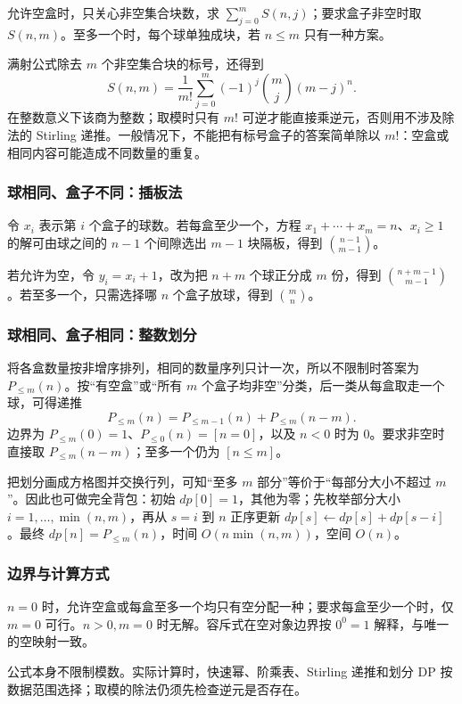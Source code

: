 允许空盒时，只关心非空集合块数，求 $\sum_{j=0}^m S(n,j)$；要求盒子非空时取 $S(n,m)$。至多一个时，每个球单独成块，若 $n\leq m$ 只有一种方案。

满射公式除去 $m$ 个非空集合块的标号，还得到
\[
    S(n,m)=\frac1{m!}\sum_{j=0}^m(-1)^j\binom mj(m-j)^n.
\]
在整数意义下该商为整数；取模时只有 $m!$ 可逆才能直接乘逆元，否则用不涉及除法的 Stirling 递推。一般情况下，不能把有标号盒子的答案简单除以 $m!$：空盒或相同内容可能造成不同数量的重复。

\subsubsection*{球相同、盒子不同：插板法}
令 $x_i$ 表示第 $i$ 个盒子的球数。若每盒至少一个，方程 $x_1+\cdots+x_m=n$、$x_i\geq1$ 的解可由球之间的 $n-1$ 个间隙选出 $m-1$ 块隔板，得到 $\binom{n-1}{m-1}$。

若允许为空，令 $y_i=x_i+1$，改为把 $n+m$ 个球正分成 $m$ 份，得到 $\binom{n+m-1}{m-1}$。若至多一个，只需选择哪 $n$ 个盒子放球，得到 $\binom mn$。

\subsubsection*{球相同、盒子相同：整数划分}
将各盒数量按非增序排列，相同的数量序列只计一次，所以不限制时答案为 $P_{\leq m}(n)$。按“有空盒”或“所有 $m$ 个盒子均非空”分类，后一类从每盒取走一个球，可得递推
\[
    P_{\leq m}(n)=P_{\leq m-1}(n)+P_{\leq m}(n-m).
\]
边界为 $P_{\leq m}(0)=1$、$P_{\leq0}(n)=[n=0]$，以及 $n<0$ 时为 $0$。要求非空时直接取 $P_{\leq m}(n-m)$；至多一个仍为 $[n\leq m]$。

把划分画成方格图并交换行列，可知“至多 $m$ 部分”等价于“每部分大小不超过 $m$”。因此也可做完全背包：初始 $dp[0]=1$，其他为零；先枚举部分大小 $i=1,\ldots,\min(n,m)$，再从 $s=i$ 到 $n$ 正序更新 $dp[s]\gets dp[s]+dp[s-i]$。最终 $dp[n]=P_{\leq m}(n)$，时间 $O(n\min(n,m))$，空间 $O(n)$。

\subsubsection*{边界与计算方式}
$n=0$ 时，允许空盒或每盒至多一个均只有空分配一种；要求每盒至少一个时，仅 $m=0$ 可行。$n>0,m=0$ 时无解。容斥式在空对象边界按 $0^0=1$ 解释，与唯一的空映射一致。

公式本身不限制模数。实际计算时，快速幂、阶乘表、Stirling 递推和划分 DP 按数据范围选择；取模的除法仍须先检查逆元是否存在。
